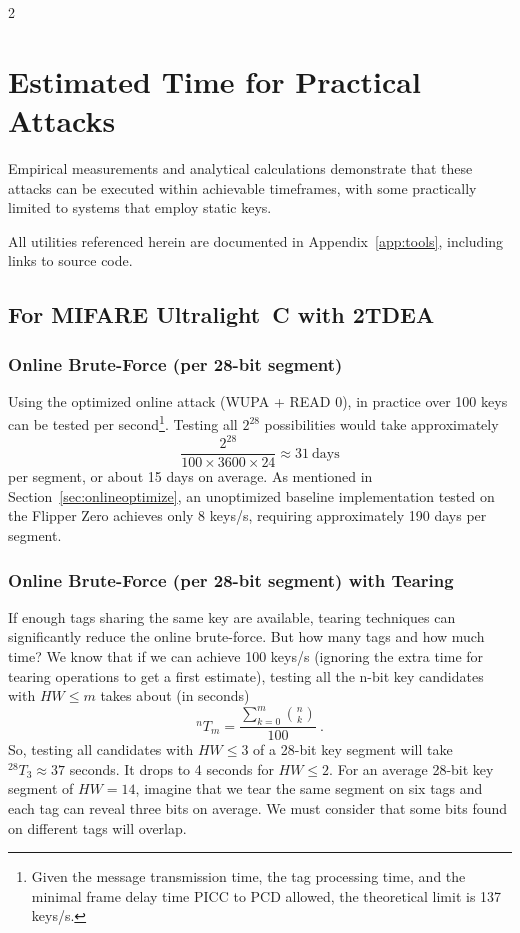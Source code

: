 \documentclass[10pt,letterpaper]{article}
\begin{document}
\begin{multicols}{2}
\section{Estimated Time for Practical Attacks}
\label{sec:estimate}

Empirical measurements and analytical calculations demonstrate that these attacks can be executed within achievable timeframes, with some practically limited to systems that employ static keys.

All utilities referenced herein are documented in Appendix~\ref{app:tools}, including links to source code.

\subsection{For MIFARE Ultralight~C with 2TDEA}
\label{sec:estimate_ulc}
\subsubsection*{Online Brute-Force (per 28-bit segment)}
Using the optimized online attack (WUPA + READ 0), in practice over 100 keys can be tested per second\footnote{Given the message transmission time, the tag processing time, and the minimal frame delay time PICC to PCD allowed, the theoretical limit is 137 keys/s.}. Testing all $2^{28}$ possibilities would take approximately 
\[
\frac{2^{28}}{100 \times 3600 \times 24} \approx 31~\text{days}
\]
per segment, or about 15 days on average. As mentioned in Section~\ref{sec:onlineoptimize}, an unoptimized baseline implementation tested on the Flipper Zero achieves only 8 keys/s, requiring approximately 190 days per segment.

\columnbreak
\subsubsection*{Online Brute-Force (per 28-bit segment) with Tearing}
\setlength{\parindent}{15pt}
If enough tags sharing the same key are available, tearing techniques can significantly reduce the online brute-force.
But how many tags and how much time?
We know that if we can achieve 100 keys/s (ignoring the extra time for tearing operations to get a first estimate), testing all the n-bit key candidates with $HW \leq m$ takes about (in seconds)
\[
{{}^{n}T_{m}}=\frac{\displaystyle\sum_{k=0}^{m} \binom{n}{k}}{100}~\text{.}
\]
So, testing all candidates with $HW \leq 3$ of a 28-bit key segment will take ${}^{28}T_{3}\approx 37$ seconds. It drops to 4 seconds for $HW \leq 2$.
For an average 28-bit key segment of $HW=14$, imagine that we tear the same segment on six tags and each tag can reveal three bits on average.
We must consider that some bits found on different tags will overlap.


\end{multicols}
\end{document}

